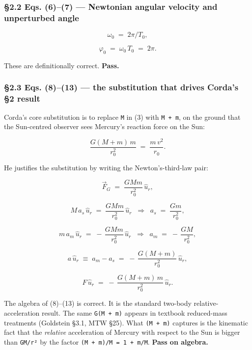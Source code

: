 \documentclass[
  11pt,
]{article}
\begin{document}
\hypertarget{eqs.-67-newtonian-angular-velocity-and-unperturbed-angle}{%
\subsubsection{§2.2 Eqs. (6)--(7) --- Newtonian angular velocity and
unperturbed
angle}\label{eqs.-67-newtonian-angular-velocity-and-unperturbed-angle}}

\[
\omega_{0} \;=\; 2\pi / T_{0}, \tag{6}
\]

\[
\varphi_{0} \;=\; \omega_{0}\,T_{0} \;=\; 2\pi. \tag{7}
\]

These are definitionally correct. \textbf{Pass.}

\hypertarget{eqs.-813-the-substitution-that-drives-cordas-2-result}{%
\subsubsection{§2.3 Eqs. (8)--(13) --- the substitution that drives
Corda's §2
result}\label{eqs.-813-the-substitution-that-drives-cordas-2-result}}

Corda's core substitution is to replace \texttt{M} in (3) with
\texttt{M\ +\ m}, on the ground that the Sun-centred observer sees
Mercury's reaction force on the Sun:

\[
\frac{G(M+m)\,m}{r_{0}^{2}} \;=\; \frac{m\,v^{2}}{r_{0}}. \tag{8}
\]

He justifies the substitution by writing the Newton's-third-law pair:

\[
\vec F_{G} \;=\; \frac{G M m}{r_{0}^{2}}\,\hat u_{r}, \tag{9}
\]

\[
M\,a_{s}\,\hat u_{r} \;=\; \frac{G M m}{r_{0}^{2}}\,\hat u_{r}
\;\;\Rightarrow\;\;
a_{s} \;=\; \frac{G m}{r_{0}^{2}}, \tag{10}
\]

\[
m\,a_{m}\,\hat u_{r} \;=\; -\,\frac{G M m}{r_{0}^{2}}\,\hat u_{r}
\;\;\Rightarrow\;\;
a_{m} \;=\; -\,\frac{G M}{r_{0}^{2}}, \tag{11}
\]

\[
a\,\hat u_{r} \;\equiv\; a_{m} - a_{s} \;=\; -\,\frac{G(M+m)}{r_{0}^{2}}\,\hat u_{r}, \tag{12}
\]

\[
F\,\hat u_{r} \;=\; -\,\frac{G(M+m)\,m}{r_{0}^{2}}\,\hat u_{r}. \tag{13}
\]

The algebra of (8)--(13) is correct. It is the standard two-body
relative-acceleration result. The same \texttt{G(M\ +\ m)} appears in
textbook reduced-mass treatments (Goldstein §3.1, MTW §25). What
\texttt{(M\ +\ m)} captures is the kinematic fact that the
\emph{relative} acceleration of Mercury with respect to the Sun is
bigger than \texttt{GM/r²} by the factor
\texttt{(M\ +\ m)/M\ =\ 1\ +\ m/M}. \textbf{Pass on algebra.}
\end{document}
